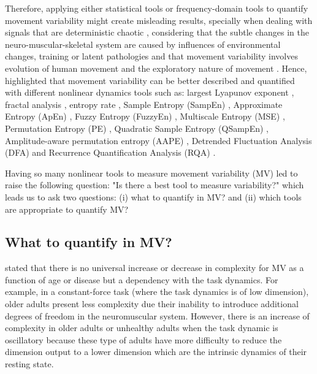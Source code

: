 Therefore, applying either statistical tools or frequency-domain tools 
to quantify movement variability might create misleading results, 
specially when dealing with signals that are deterministic chaotic 
\citep{amato1992, dingwell2000, dingwell2007, miller2006},
considering  
that the subtle changes in the neuro-muscular-skeletal system are caused by 
influences of environmental changes, training or latent 
pathologies \citep{preatoni2010, preatoni2013}
and that movement variability involves evolution of human movement and 
the exploratory nature of movement \citep{stergiou2011, caballero2014}. 
Hence, \cite{stergiou2011, preatoni2010, caballero2014} 
highlighted that movement variability can be better described and quantified 
with different nonlinear dynamics tools such as: 
largest Lyapunov exponent \citep{bruijn2009, donker2007, kurz2010b, 
yang2011},
fractal analysis \citep{delignleres2003},
entropy rate \citep{cavanaugh2010},
Sample Entropy (SampEn)  \citep{richman2000, donker2007, liao2008, 
stins2009, vaillancourt2004},
Approximate Entropy (ApEn) \citep{pincus1991, kurz2010a, sosnoff2006, 
sosnoff2009, cavanaugh2010},
Fuzzy Entropy (FuzzyEn) \citep{chen2007},
Multiscale Entropy (MSE) \citep{costa2002},
Permutation Entropy (PE) \citep{bandt2002, vakharia2015},
Quadratic Sample Entropy (QSampEn) \citep{lake2011},
Amplitude-aware permutation entropy (AAPE) \citep{azami2016},
Detrended Fluctuation Analysis (DFA) \citep{gates2007, gates2008, 
hausdorff200} and 
Recurrence Quantification Analysis (RQA) \citep{zbilut1992, trulla1996, 
marwan2008}.



Having so many nonlinear tools to measure movement variability (MV) 
led \citealt[p. 67]{caballero2014} to raise the following question: 
"Is there a best tool to measure variability?" which leads us to ask
two questions: (i) what to quantify in MV? 
and (ii) which tools are appropriate to quantify MV?

\subsection{What to quantify in MV?} \label{what_to_measure_with_MV}
\cite{vaillancourt2002, vaillancourt2003} stated that there is no universal 
increase or decrease in complexity for MV as a function of age or disease 
but a dependency with the task dynamics. For example, in a constant-force 
task (where the task dynamics is of low dimension), older adults 
present less complexity due their inability to introduce additional degrees 
of freedom in the neuromuscular system. However, there is an increase of 
complexity in older adults or unhealthy adults when the task dynamic is 
oscillatory because these type of adults have more difficulty to reduce 
the dimension output to a lower dimension which are the intrinsic dynamics 
of their resting state.

